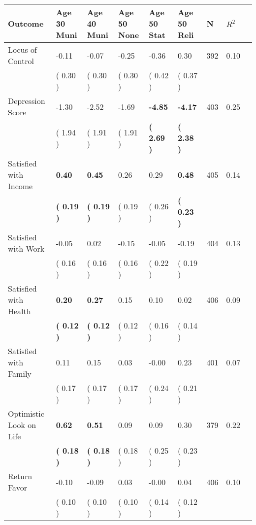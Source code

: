 \begin{tabular}{L{6.2cm} C{1.8cm} C{1.8cm} C{1.8cm} C{1.8cm} C{1.8cm} C{1.8cm} C{0.3cm} C{0.3cm}}
\toprule
 \textbf{Outcome} & \textbf{Age 30 Muni} & \textbf{Age 40 Muni} & \textbf{Age 50 None} & \textbf{Age 50 Stat} & \textbf{Age 50 Reli} & \textbf{N} & \textbf{$ R^2$} \\
\midrule
Locus of Control &     -0.11 &     -0.07 &     -0.25 &     -0.36 &      0.30  & 392 &       0.10 \\ 
 & (     0.30 ) & (     0.30 ) & (     0.30 ) & (     0.42 ) & (     0.37 )  & \\
Depression Score &     -1.30 &     -2.52 &     -1.69 & \textbf{    -4.85} & \textbf{    -4.17}  & 403 &       0.25 \\ 
 & (     1.94 ) & (     1.91 ) & (     1.91 ) & \textbf{(     2.69 )} & \textbf{(     2.38 )}  & \\
Satisfied with Income & \textbf{     0.40} & \textbf{     0.45} &      0.26 &      0.29 & \textbf{     0.48}  & 405 &       0.14 \\ 
 & \textbf{(     0.19 )} & \textbf{(     0.19 )} & (     0.19 ) & (     0.26 ) & \textbf{(     0.23 )}  & \\
Satisfied with Work &     -0.05 &      0.02 &     -0.15 &     -0.05 &     -0.19  & 404 &       0.13 \\ 
 & (     0.16 ) & (     0.16 ) & (     0.16 ) & (     0.22 ) & (     0.19 )  & \\
Satisfied with Health & \textbf{     0.20} & \textbf{     0.27} &      0.15 &      0.10 &      0.02  & 406 &       0.09 \\ 
 & \textbf{(     0.12 )} & \textbf{(     0.12 )} & (     0.12 ) & (     0.16 ) & (     0.14 )  & \\
Satisfied with Family &      0.11 &      0.15 &      0.03 &     -0.00 &      0.23  & 401 &       0.07 \\ 
 & (     0.17 ) & (     0.17 ) & (     0.17 ) & (     0.24 ) & (     0.21 )  & \\
Optimistic Look on Life & \textbf{     0.62} & \textbf{     0.51} &      0.09 &      0.09 &      0.30  & 379 &       0.22 \\ 
 & \textbf{(     0.18 )} & \textbf{(     0.18 )} & (     0.18 ) & (     0.25 ) & (     0.23 )  & \\
Return Favor &     -0.10 &     -0.09 &      0.03 &     -0.00 &      0.04  & 406 &       0.10 \\ 
 & (     0.10 ) & (     0.10 ) & (     0.10 ) & (     0.14 ) & (     0.12 )  & \\

\end{tabular}
